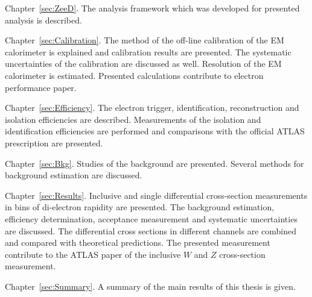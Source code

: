 \begin{description}
\item Chapter~\ref{sec:ZeeD}. The analysis framework which was developed for presented analysis is described. 

\item Chapter~\ref{sec:Calibration}. The method of the off-line calibration of the EM calorimeter is explained and calibration results are presented. The systematic uncertainties of the calibration are discussed as well. Resolution of the EM calorimeter is estimated. Presented calculations contribute to electron performance paper.

\item Chapter~\ref{sec:Efficiency}. The electron trigger, identification, reconstruction and isolation efficiencies are described. Measurements of the isolation and identification efficiencies are performed and comparisons with the official ATLAS prescription are presented.

\item Chapter~\ref{sec:Bkg}. Studies of the background are presented. Several methods for background estimation are discussed. 

\item Chapter~\ref{sec:Results}. Inclusive and single differential cross-section measurements in bins of di-electron rapidity are presented. The background estimation, efficiency determination, acceptance measurement and systematic uncertainties are discussed. The differential cross sections in different channels are combined and compared with theoretical predictions. The presented measurement contribute to the ATLAS paper of the inclusive $W$ and $Z$ cross-section measurement.

\item Chapter~\ref{sec:Summary}. A summary of the main results of this thesis is given.
\end{description} 
